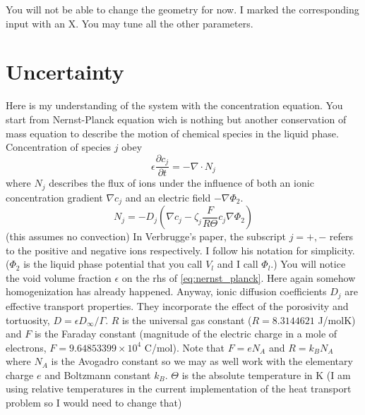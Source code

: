 \documentclass[10pt, oneside]{article}   	%
\begin{document}
You will not be able to change the geometry for now. I marked the corresponding
input with an X. 
You may tune all the other parameters.







\newpage
\section{Uncertainty}

Here is my understanding of the system with the concentration equation.
You start from Nernst-Planck equation wich is nothing but another conservation
of mass equation to describe the motion of chemical species in the liquid
phase.
Concentration of species $j$ obey
\begin{equation}
\epsilon \frac{\partial c_j}{\partial t} = - \nabla \cdot N_j
\label{eq:nernst_planck}
\end{equation}
where $N_j$ describes the flux of ions under the influence of both an ionic
concentration gradient $\nabla c_j$ and an electric field $-\nabla \Phi_2$.
\begin{equation}
N_j = -D_j (\nabla c_j - \zeta_j \frac{F}{R\Theta} c_j \nabla \Phi_2)
\end{equation}
(this assumes no convection)
In Verbrugge's paper, the subscript $j=+,-$ refers to the positive and
negative ions respectively.  I follow his notation for simplicity.
($\Phi_2$ is the liquid phase potential that you call $V_l$ and I call $\Phi_l$.)
You will notice the void volume fraction $\epsilon$ on the rhs of
\eqref{eq:nernst_planck}.  Here again somehow homogenization has already
happened.  Anyway, ionic diffusion coefficients $D_j$ are effective transport
properties.  They incorporate the effect of the porosivity and tortuosity, 
$D = \epsilon D_\infty / \Gamma$.
$R$ is the universal gas constant ($R=8.3144621$ J/molK) and $F$ is the
Faraday constant (magnitude of the electric charge in a mole of electrons,
$F=9.64853399\times10^4$ C/mol).
Note that $F=e N_A$ and $R=k_B N_A$ where $N_A$ is the Avogadro constant so we
may as well work with the elementary charge $e$ and Boltzmann constant $k_B$.
$\Theta$ is the absolute temperature in K 
(I am using relative temperatures in the current implementation of the heat
transport problem so I would need to change that)
\end{document}
